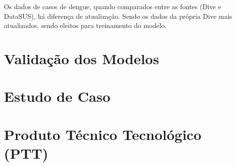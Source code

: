 \indent Os dados de casos de dengue, quando comparados entre as fontes (\acrshort{Dive} e \acrshort{DataSUS}), há diferença de atualização. Sendo os dados da própria \acrshort{Dive} mais atualizados, sendo eleitos para treinamento do modelo.

\section{Validação dos Modelos}

\section{Estudo de Caso}

\section{Produto Técnico Tecnológico (PTT)}



